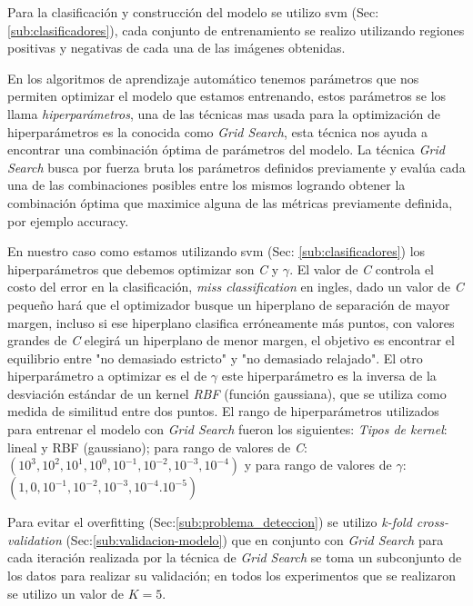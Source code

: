Para la clasificación y construcción del modelo se utilizo \ac{svm} (Sec: \ref{sub:clasificadores}), cada conjunto de entrenamiento se realizo utilizando regiones positivas y negativas de cada una de las imágenes obtenidas.

En los algoritmos de aprendizaje automático tenemos parámetros que nos permiten optimizar el modelo que estamos entrenando, estos  parámetros se los llama \textit{hiperparámetros}, una de las técnicas mas usada para la optimización de hiperparámetros es la conocida como \textit{Grid Search}, esta técnica nos ayuda a encontrar una combinación óptima de parámetros del modelo. La técnica \textit{Grid Search} busca por fuerza bruta los parámetros definidos previamente y evalúa cada una de las combinaciones posibles entre los mismos logrando obtener la combinación óptima que maximice alguna de las métricas previamente definida, por ejemplo accuracy. 

En nuestro caso como estamos utilizando \ac{svm} (Sec: \ref{sub:clasificadores}) los hiperparámetros que debemos optimizar son \textit{C} y $\gamma$. El valor de \textit{C} controla el costo del error en la clasificación, \textit{miss classification} en ingles, dado un valor de \textit{C} pequeño hará que el optimizador busque un hiperplano de separación de mayor margen, incluso si ese hiperplano clasifica erróneamente más puntos, con valores grandes de \textit{C}  elegirá un hiperplano de menor margen, el objetivo es encontrar el equilibrio entre "no demasiado estricto" y  "no demasiado relajado". El otro hiperparámetro a  optimizar es el de  $\gamma$ este hiperparámetro es la inversa de la desviación estándar de un kernel \textit{RBF} (función gaussiana), que se utiliza como medida de similitud entre dos puntos.
El rango de hiperparámetros utilizados para entrenar el modelo con \textit{Grid Search} fueron los siguientes: \textit{Tipos de kernel}: lineal y RBF (gaussiano); para rango de valores de \textit{C}: $(10^{3}, 10^{2}, 10^{1}, 10^{0}, 10^{-1},10^{-2}, 10^{-3}, 10^{-4})$
    y para rango de valores de $\gamma$: $(1,0,10^{-1}, 10^{-2},10^{-3},10^{-4}. 10^{-5})$
    
Para evitar el overfitting (Sec:\ref{sub:problema_deteccion}) se utilizo \textit{k-fold cross-validation} (Sec:\ref{sub:validacion-modelo}) que en conjunto con \textit{Grid Search} para cada  iteración realizada por la técnica de \textit{Grid Search} se toma un subconjunto de los datos para realizar su validación; en todos los experimentos que se realizaron se utilizo un valor de $K = 5$.



